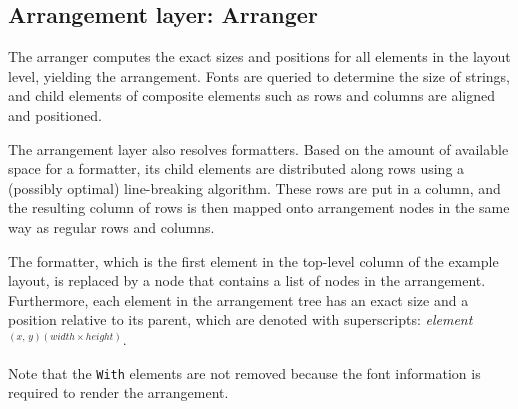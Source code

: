 \documentclass{speauth}
\begin{document}
%																
\subsection{Arrangement layer: Arranger} \label{sect:arranger}

The arranger computes the exact sizes and positions for all elements in the layout level, yielding the arrangement. Fonts are queried to determine the size of strings, and child elements of composite elements such as rows and columns are aligned and positioned.

The arrangement layer also resolves formatters. Based on the amount of available space for a formatter, its child elements are distributed along rows using a (possibly optimal) line-breaking algorithm. These rows are put in a column, and the resulting column of rows is then mapped onto arrangement nodes in the same way as regular rows and columns.


 The formatter, which is the first element in the top-level column of the example layout, is replaced by a node that contains a list of nodes in the arrangement. Furthermore, each element in the arrangement tree has an exact size and a position relative to its parent, which are denoted with superscripts: {\em element}$^{(x,\,y)(\mathit{width}\times \mathit{height})}$. 

Note that the \verb|With| elements are not removed because the font information is required to render the arrangement.
\end{document}
